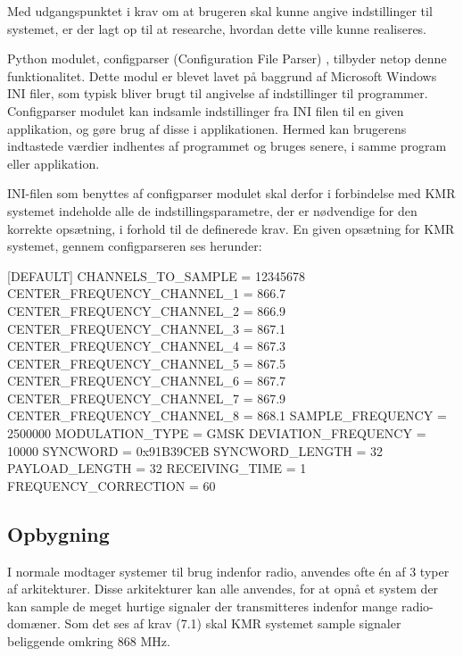 \begin{appendices}
Med udgangspunktet i krav om at brugeren skal kunne angive indstillinger til systemet, er der lagt op til at researche, hvordan dette ville kunne realiseres.

Python modulet, configparser (Configuration File Parser) \cite{configparser}, tilbyder netop denne funktionalitet. Dette modul er blevet lavet på baggrund af Microsoft Windows INI filer, som typisk bliver brugt til angivelse af indstillinger til programmer. Configparser modulet kan indsamle indstillinger fra INI filen til en given applikation, og gøre brug af disse i applikationen. Hermed kan brugerens indtastede værdier indhentes af programmet og bruges senere, i samme program eller applikation.

INI-filen som benyttes af configparser modulet skal derfor i forbindelse med KMR systemet indeholde alle de indstillingsparametre, der er nødvendige for den korrekte opsætning, i forhold til de definerede krav. En given opsætning for KMR systemet, gennem configparseren ses herunder:

[DEFAULT] \newline \newline
CHANNELS\_TO\_SAMPLE = 12345678 \newline
CENTER\_FREQUENCY\_CHANNEL\_1 = 866.7 \newline
CENTER\_FREQUENCY\_CHANNEL\_2 = 866.9 \newline
CENTER\_FREQUENCY\_CHANNEL\_3 = 867.1 \newline
CENTER\_FREQUENCY\_CHANNEL\_4 = 867.3 \newline
CENTER\_FREQUENCY\_CHANNEL\_5 = 867.5 \newline
CENTER\_FREQUENCY\_CHANNEL\_6 = 867.7 \newline
CENTER\_FREQUENCY\_CHANNEL\_7 = 867.9 \newline
CENTER\_FREQUENCY\_CHANNEL\_8 = 868.1 \newline
SAMPLE\_FREQUENCY = 2500000 \newline
MODULATION\_TYPE = GMSK \newline
DEVIATION\_FREQUENCY = 10000
SYNCWORD = 0x91B39CEB \newline
SYNCWORD\_LENGTH = 32 \newline
PAYLOAD\_LENGTH = 32 \newline
RECEIVING\_TIME = 1 \newline
FREQUENCY\_CORRECTION = 60 \newline

\pagebreak
\subsection{Opbygning}
I normale modtager systemer til brug indenfor radio, anvendes ofte én af 3 typer af arkitekturer. Disse arkitekturer kan alle anvendes, for at opnå et system der kan sample de meget hurtige signaler der transmitteres indenfor mange radio-domæner. Som det ses af krav (7.1) skal KMR systemet sample signaler beliggende omkring 868 MHz. 


\end{appendices}
